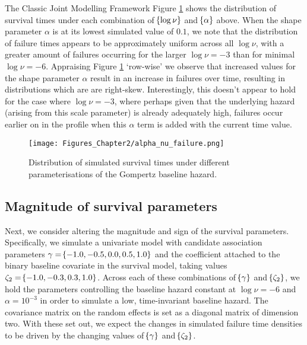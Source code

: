 \begin{chapter}{\label{cha:methods-classic}The Classic Joint Modelling Framework}
  Figure \ref{fig:sim-alphanu} shows the distribution of survival times under each combination of $\!\left\{\log\nu\right\}$ and $\!\left\{\alpha\right\}$ above. When the shape parameter $\alpha$ is at its lowest simulated value of $0.1$, we note that the distribution of failure times appears to be approximately uniform across all $\log\nu$, with a greater amount of failures occurring for the larger $\log\nu=-3$ than for minimal $\log\nu=-6$. Appraising Figure \ref{fig:sim-alphanu} `row-wise' we observe that increased values for the shape parameter $\alpha$ result in an increase in failures over time, resulting in distributions which are are right-skew. Interestingly, this doesn't appear to hold for the case where $\log\nu=-3$, where perhaps given that the underlying hazard (arising from this scale parameter) is already adequately high, failures occur earlier on in the profile when this $\alpha$ term is added with the current time value.
  \begin{figure}[t]
    \centering
    \texttt{[image: Figures\_Chapter2/alpha\_nu\_failure.png]}
    \caption{Distribution of simulated survival times under different parameterisations of the Gompertz baseline hazard.}
  \label{fig:sim-alphanu}
  \end{figure}
  
  \subsection{Magnitude of survival parameters}\label{sec:sim-considerations-gammazeta}
  Next, we consider altering the magnitude and sign of the survival parameters. Specifically, we simulate a univariate model with candidate association parameters $\gamma=\!\left\{-1.0, -0.5, 0.0, 0.5, 1.0\right\}$ and the coefficient attached to the binary baseline covariate in the survival model, taking values $\zeta_2=\!\left\{-1.0, -0.3, 0.3, 1.0\right\}$. Across each of these combinations of $\!\left\{\gamma\right\}$ and $\!\left\{\zeta_2\right\}$, we hold the parameters controlling the baseline hazard constant at $\log\nu=-6$ and $\alpha = 10^{-3}$ in order to simulate a low, time-invariant baseline hazard. The covariance matrix on the random effects is set as a diagonal matrix of dimension two. With these set out, we expect the changes in simulated failure time densities to be driven by the changing values of $\!\left\{\gamma\right\}$ and $\!\left\{\zeta_2\right\}$.
  

\end{chapter}
